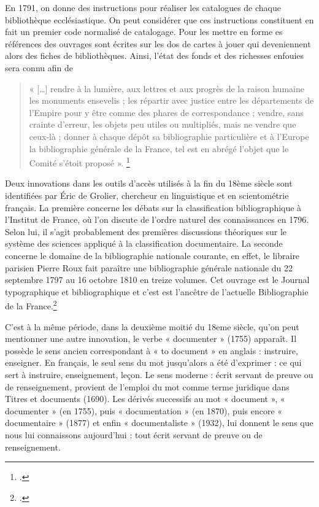 En 1791, on donne des instructions pour réaliser les catalogues de chaque bibliothèque ecclésiastique. On peut considérer que ces instructions constituent en fait un premier code normalisé de catalogage. Pour les mettre en forme es références des ouvrages sont écrites sur les dos de cartes à jouer qui deveniennent alors des fiches de bibliothèques. Ainsi, l’état des fonds et des richesses enfouies sera connu afin de
\begin{quote}  
« […] rendre à la lumière, aux lettres et aux progrès de la raison humaine les monuments ensevelis ; les répartir avec justice entre les départements de l’Empire pour y être comme des phares de correspondance ; vendre, sans crainte d’erreur, les objets peu utiles ou multipliés, mais ne vendre que ceux-là ; donner à chaque dépôt sa bibliographie particulière et à l’Europe la bibliographie générale de la France, tel est en abrégé l’objet que le Comité s’étoit proposé ». \footcite{fayet_scribe_2000}
\end{quote}
Deux innovations dans les outils d'accès utilisés à la fin du 18ème siècle sont identifiées par Éric de Grolier, chercheur en linguistique et en scientométrie français. La première concerne les débats sur la classification bibliographique à l'Institut de France, où l'on discute de l'ordre naturel des connaissances en 1796. Selon lui, il s'agit probablement des premières discussions théoriques sur le système des sciences appliqué à la classification documentaire. La seconde concerne le domaine de la bibliographie nationale courante, en effet, le libraire parisien Pierre Roux fait paraître une bibliographie générale nationale du 22 septembre 1797 au 16 octobre 1810 en treize volumes. Cet ouvrage est le Journal typographique et bibliographique et c’est est l’ancêtre de l’actuelle Bibliographie de la France.\footcite{fayet_scribe_2000}\newline

C’est à la même période, dans la deuxième moitié du 18eme siècle, qu’on peut mentionner une autre innovation, le verbe « documenter » (1755) apparaît. Il possède le sens ancien correspondant à « to document » en anglais : instruire, enseigner. En français, le seul sens du mot jusqu’alors a été d’exprimer : ce qui sert à instruire, enseignement, leçon. Le sens moderne : écrit servant de preuve ou de renseignement, provient de l’emploi du mot comme terme juridique dans Titres et documents (1690). Les dérivés successifs au mot « document », « documenter » (en 1755), puis « documentation » (en 1870), puis encore « documentaire » (1877) et enfin « documentaliste » (1932), lui donnent le sens que nous lui connaissons aujourd'hui : tout écrit servant de preuve ou de renseignement. \newline

